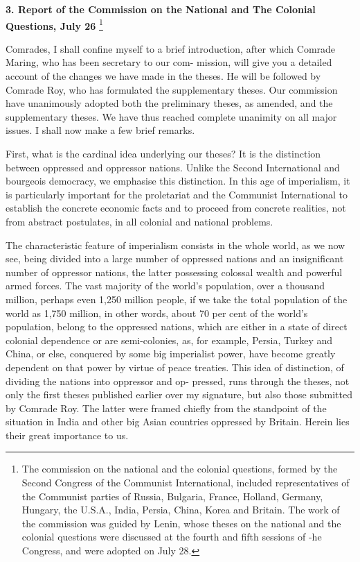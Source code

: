 \textbf{3. Report of the Commission on the National and The Colonial Questions, July 26}
\footnote{The commission on the national and the colonial questions, formed by the Second Congress of the Communist International, included representatives of the Communist parties of Russia, Bulgaria, France, Holland, Germany, Hungary, the U.S.A., India, Persia, China, Korea and Britain. The work of the commission was guided by Lenin, whose theses on the national and the colonial questions were discussed at the fourth and fifth sessions of -he Congress, and were adopted on July 28. }

Comrades, I shall confine myself to a brief introduction, after which Comrade Maring, who has been secretary to our com- mission, will give you a detailed account of the changes we have made in the theses. He will be followed by Comrade Roy, who has formulated the supplementary theses. Our commission have unanimously adopted both the preliminary theses, as amended, and the supplementary theses. We have thus reached complete unanimity on all major issues. I shall now make a few brief remarks.

First, what is the cardinal idea underlying our theses? It is the distinction between oppressed and oppressor nations. Unlike the Second International and bourgeois democracy, we emphasise this distinction. In this age of imperialism, it is particularly important for the proletariat and the Communist International to establish the concrete economic facts and to proceed from concrete realities, not from abstract postulates, in all colonial and national problems. 

The characteristic feature of imperialism consists in the whole world, as we now see, being divided into a large number of oppressed nations and an insignificant number of oppressor nations, the latter possessing colossal wealth and powerful armed forces. The vast majority of the world’s population, over a thousand million, perhaps even 1,250 million people, if we take the total population of the world as 1,750 million, 
in other words, about 70 per cent of the world’s population, belong to the oppressed nations, which are either in a state of direct colonial dependence or are semi-colonies, as, for example, Persia, Turkey and China, or else, conquered by some big imperialist power, have become greatly dependent on that power by virtue of peace treaties. This idea of distinction, of dividing the nations into oppressor and op- 
pressed, runs through the theses, not only the first theses published earlier over my signature, but also those submitted by Comrade Roy. The latter were framed chiefly from the standpoint of the situation in India and other big Asian countries oppressed by Britain. Herein lies their great importance to us. 

